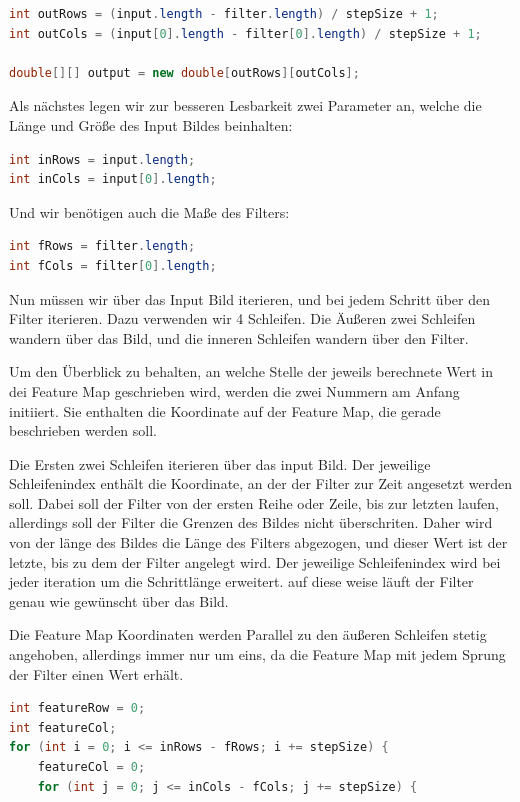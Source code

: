 \documentclass[12pt]{article}
\begin{document}
\begin{lstlisting}[language=Java]
int outRows = (input.length - filter.length) / stepSize + 1;
int outCols = (input[0].length - filter[0].length) / stepSize + 1;

double[][] output = new double[outRows][outCols];
\end{lstlisting}

Als nächstes legen wir zur besseren Lesbarkeit zwei Parameter an, welche die Länge und Größe des Input Bildes beinhalten:

\begin{lstlisting}[language=Java]
int inRows = input.length;
int inCols = input[0].length;
\end{lstlisting}

Und wir benötigen auch die Maße des Filters:

\begin{lstlisting}[language=Java]
int fRows = filter.length;
int fCols = filter[0].length;
\end{lstlisting}

Nun müssen wir über das Input Bild iterieren, und bei jedem Schritt über den Filter iterieren. Dazu verwenden wir 4 Schleifen. Die Äußeren zwei Schleifen wandern über das Bild, und die inneren Schleifen wandern über den Filter. 

Um den Überblick zu behalten, an welche Stelle der jeweils berechnete Wert in dei Feature Map geschrieben wird, werden die zwei Nummern am Anfang initiiert. Sie enthalten die Koordinate auf der Feature Map, die gerade beschrieben werden soll.

Die Ersten zwei Schleifen iterieren über das input Bild. Der jeweilige Schleifenindex enthält die Koordinate, an der der Filter zur Zeit angesetzt werden soll. Dabei soll der Filter von der ersten Reihe oder Zeile, bis zur letzten laufen, allerdings soll der Filter die Grenzen des Bildes nicht überschriten. Daher wird von der länge des Bildes die Länge des Filters abgezogen, und dieser Wert ist der letzte, bis zu dem der Filter angelegt wird. Der jeweilige Schleifenindex wird bei jeder iteration um die Schrittlänge erweitert. auf diese weise läuft der Filter genau wie gewünscht über das Bild.

Die Feature Map Koordinaten werden Parallel zu den äußeren Schleifen stetig angehoben, allerdings immer nur um eins, da die Feature Map mit jedem Sprung der Filter einen Wert erhält.

\begin{lstlisting}[language=Java]
int featureRow = 0;
int featureCol;
for (int i = 0; i <= inRows - fRows; i += stepSize) {
    featureCol = 0;
    for (int j = 0; j <= inCols - fCols; j += stepSize) {
\end{lstlisting}
\end{document}
